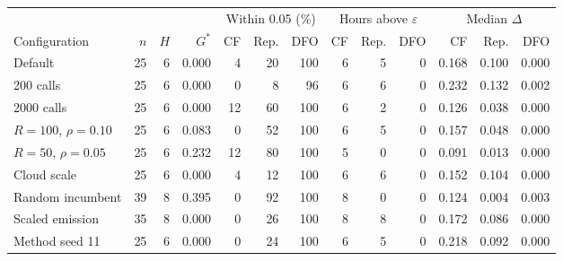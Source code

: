 \begin{tabular}{@{}lrrrrrrrrrrrr@{}}
\toprule
 & & & & \multicolumn{3}{c}{Within 0.05 (\%)} & \multicolumn{3}{c}{Hours above $\varepsilon$} & \multicolumn{3}{c}{Median $\Delta$} \\
\cmidrule(lr){5-7}\cmidrule(lr){8-10}\cmidrule(l){11-13}
Configuration & $n$ & $H$ & $G^{*}$ & CF & Rep. & DFO & CF & Rep. & DFO & CF & Rep. & DFO \\
\midrule
Default & 25 & 6 & 0.000 & 4 & 20 & 100 & 6 & 5 & 0 & 0.168 & 0.100 & 0.000 \\
200 calls & 25 & 6 & 0.000 & 0 & 8 & 96 & 6 & 6 & 0 & 0.232 & 0.132 & 0.002 \\
2000 calls & 25 & 6 & 0.000 & 12 & 60 & 100 & 6 & 2 & 0 & 0.126 & 0.038 & 0.000 \\
$R=100$, $\rho=0.10$ & 25 & 6 & 0.083 & 0 & 52 & 100 & 6 & 5 & 0 & 0.157 & 0.048 & 0.000 \\
$R=50$, $\rho=0.05$ & 25 & 6 & 0.232 & 12 & 80 & 100 & 5 & 0 & 0 & 0.091 & 0.013 & 0.000 \\
Cloud scale & 25 & 6 & 0.000 & 4 & 12 & 100 & 6 & 6 & 0 & 0.152 & 0.104 & 0.000 \\
Random incumbent & 39 & 8 & 0.395 & 0 & 92 & 100 & 8 & 0 & 0 & 0.124 & 0.004 & 0.003 \\
Scaled emission & 35 & 8 & 0.000 & 0 & 26 & 100 & 8 & 8 & 0 & 0.172 & 0.086 & 0.000 \\
Method seed 11 & 25 & 6 & 0.000 & 0 & 24 & 100 & 6 & 5 & 0 & 0.218 & 0.092 & 0.000 \\
\bottomrule
\end{tabular}
